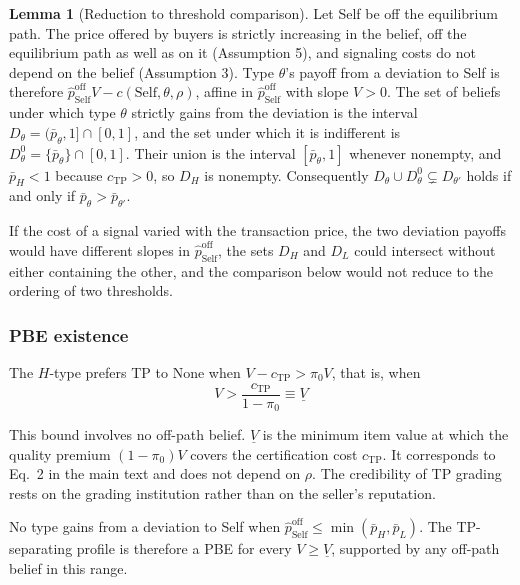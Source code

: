 \documentclass[11pt,letterpaper]{article}
\theoremstyle{definition}
\newtheorem{lemma}{Lemma}[section]
\begin{document}
\begin{lemma}[Reduction to threshold comparison]\label{lem:threshold}
Let Self be off the equilibrium path. The price offered by buyers is strictly increasing in the belief, off the equilibrium path as well as on it (Assumption 5), and signaling costs do not depend on the belief (Assumption 3). Type $\theta$'s payoff from a deviation to Self is therefore $\hat{p}_{\text{Self}}^{\text{off}} V - c(\text{Self}, \theta, \rho)$, affine in $\hat{p}_{\text{Self}}^{\text{off}}$ with slope $V > 0$. The set of beliefs under which type $\theta$ strictly gains from the deviation is the interval $D_\theta = (\bar{p}_\theta, 1] \cap [0, 1]$, and the set under which it is indifferent is $D^0_\theta = \{\bar{p}_\theta\} \cap [0, 1]$. Their union is the interval $[\bar{p}_\theta, 1]$ whenever nonempty, and $\bar{p}_H < 1$ because $c_{\text{TP}} > 0$, so $D_H$ is nonempty. Consequently $D_\theta \cup D^0_\theta \subsetneq D_{\theta'}$ holds if and only if $\bar{p}_\theta > \bar{p}_{\theta'}$.
\end{lemma}

If the cost of a signal varied with the transaction price, the two deviation payoffs would have different slopes in $\hat{p}_{\text{Self}}^{\text{off}}$, the sets $D_H$ and $D_L$ could intersect without either containing the other, and the comparison below would not reduce to the ordering of two thresholds.

\subsubsection*{PBE existence}

The $H$-type prefers TP to None when $V - c_{\text{TP}} > \pi_0 V$, that is, when
\begin{equation}
V > \frac{c_{\text{TP}}}{1 - \pi_0} \equiv \underline{V} \label{eq:underline-V}
\end{equation}

This bound involves no off-path belief. $\underline{V}$ is the minimum item value at which the quality premium $(1 - \pi_0)V$ covers the certification cost $c_{\text{TP}}$. It corresponds to Eq.~2 in the main text and does not depend on $\rho$. The credibility of TP grading rests on the grading institution rather than on the seller's reputation.

No type gains from a deviation to Self when $\hat{p}_{\text{Self}}^{\text{off}} \leq \min(\bar{p}_H, \bar{p}_L)$. The TP-separating profile is therefore a PBE for every $V \geq \underline{V}$, supported by any off-path belief in this range.
\end{document}
